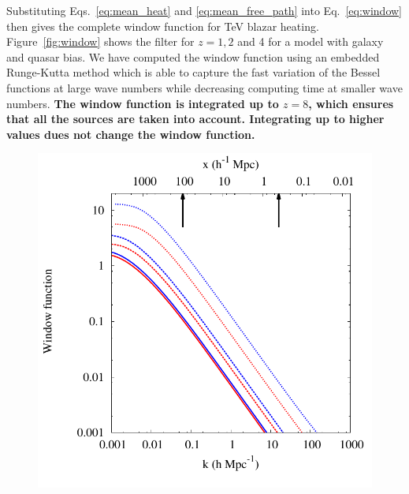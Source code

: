 \documentclass[numberedappendix]{emulateapj}
\newcommand\ALc[1]{{\color{red} \bf #1}} %
\begin{document}
{Substituting Eqs.~\eqref{eq:mean_heat} and \eqref{eq:mean_free_path} into Eq.~\eqref{eq:window} then gives the complete window function for TeV blazar heating. Figure~\ref{fig:window} shows the filter for $z=1,2$ and 4 for a model with galaxy and quasar bias. We have computed the window function using an embedded Runge-Kutta method which is able to capture the fast variation of the Bessel functions at large wave numbers while decreasing computing time at smaller wave numbers. \ALc{The window function is integrated up to $z=8$, which ensures that all the sources are taken into account. Integrating up to higher values dues not change the window function.}

\begin{figure}[h]
\centering
 \includegraphics[width = .45\textwidth ]{window_gal_qso}


\end{figure}}
\end{document}
